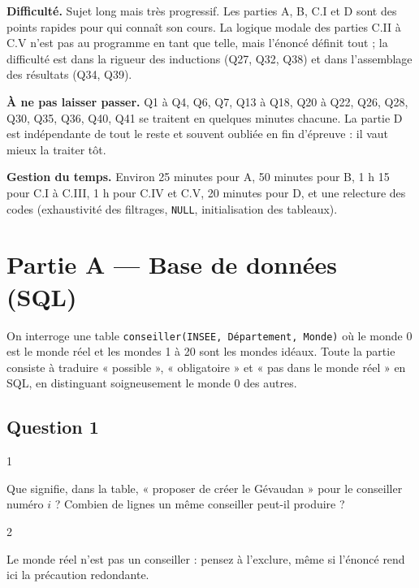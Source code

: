 \documentclass[11pt,a4paper]{article}
\begin{document}
\textbf{Difficulté.} Sujet long mais très progressif. Les parties A, B, C.I et D sont des points rapides pour qui connaît son cours. La logique modale des parties C.II à C.V n'est pas au programme en tant que telle, mais l'énoncé définit tout ; la difficulté est dans la rigueur des inductions (Q27, Q32, Q38) et dans l'assemblage des résultats (Q34, Q39).

\textbf{À ne pas laisser passer.} Q1 à Q4, Q6, Q7, Q13 à Q18, Q20 à Q22, Q26, Q28, Q30, Q35, Q36, Q40, Q41 se traitent en quelques minutes chacune. La partie D est indépendante de tout le reste et souvent oubliée en fin d'épreuve : il vaut mieux la traiter tôt.

\textbf{Gestion du temps.} Environ 25 minutes pour A, 50 minutes pour B, 1 h 15 pour C.I à C.III, 1 h pour C.IV et C.V, 20 minutes pour D, et une relecture des codes (exhaustivité des filtrages, \texttt{NULL}, initialisation des tableaux).

\hypertarget{partie-a-base-de-donnuxe9es-sql}{%
\section{Partie A --- Base de données (SQL)}\label{partie-a-base-de-donnuxe9es-sql}}

On interroge une table \texttt{conseiller(\allowbreak{}INSEE,\allowbreak{}\ Département,\allowbreak{}\ Monde)\allowbreak{}} où le monde 0 est le monde réel et les mondes 1 à 20 sont les mondes idéaux. Toute la partie consiste à traduire « possible », « obligatoire » et « pas dans le monde réel » en SQL, en distinguant soigneusement le monde 0 des autres.

\hypertarget{question-1}{%
\subsection{Question 1}\label{question-1}}

\begin{indication}{1}

Que signifie, dans la table, « proposer de créer le Gévaudan » pour le conseiller numéro \(i\) ? Combien de lignes un même conseiller peut-il produire ?

\end{indication}

\begin{indication}{2}

Le monde réel n'est pas un conseiller : pensez à l'exclure, même si l'énoncé rend ici la précaution redondante.

\end{indication}
\end{document}
